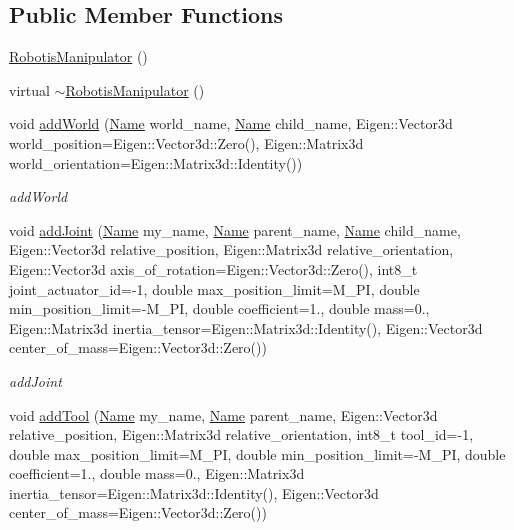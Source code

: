\subsection*{Public Member Functions}
\begin{DoxyCompactItemize}
\item 
\hyperlink{classrobotis__manipulator_1_1_robotis_manipulator_a46568e9e7167e38bc9f249ead260d07e}{Robotis\+Manipulator} ()
\item 
virtual \hyperlink{classrobotis__manipulator_1_1_robotis_manipulator_aa1a5253e03e807911de38637e7d409a6}{$\sim$\+Robotis\+Manipulator} ()
\item 
void \hyperlink{classrobotis__manipulator_1_1_robotis_manipulator_a31039ed1e93d8c9f1a83d31fadff4a5c}{add\+World} (\hyperlink{namespacerobotis__manipulator_a08c2d25e77a01ad75b9bb740f8ce4765}{Name} world\+\_\+name, \hyperlink{namespacerobotis__manipulator_a08c2d25e77a01ad75b9bb740f8ce4765}{Name} child\+\_\+name, Eigen\+::\+Vector3d world\+\_\+position=Eigen\+::\+Vector3d\+::\+Zero(), Eigen\+::\+Matrix3d world\+\_\+orientation=Eigen\+::\+Matrix3d\+::\+Identity())
\begin{DoxyCompactList}\small\item\em add\+World \end{DoxyCompactList}\item 
void \hyperlink{classrobotis__manipulator_1_1_robotis_manipulator_a7db29a00b1c10885f72bcf19798752fe}{add\+Joint} (\hyperlink{namespacerobotis__manipulator_a08c2d25e77a01ad75b9bb740f8ce4765}{Name} my\+\_\+name, \hyperlink{namespacerobotis__manipulator_a08c2d25e77a01ad75b9bb740f8ce4765}{Name} parent\+\_\+name, \hyperlink{namespacerobotis__manipulator_a08c2d25e77a01ad75b9bb740f8ce4765}{Name} child\+\_\+name, Eigen\+::\+Vector3d relative\+\_\+position, Eigen\+::\+Matrix3d relative\+\_\+orientation, Eigen\+::\+Vector3d axis\+\_\+of\+\_\+rotation=Eigen\+::\+Vector3d\+::\+Zero(), int8\+\_\+t joint\+\_\+actuator\+\_\+id=-\/1, double max\+\_\+position\+\_\+limit=M\+\_\+\+PI, double min\+\_\+position\+\_\+limit=-\/M\+\_\+\+PI, double coefficient=1., double mass=0., Eigen\+::\+Matrix3d inertia\+\_\+tensor=Eigen\+::\+Matrix3d\+::\+Identity(), Eigen\+::\+Vector3d center\+\_\+of\+\_\+mass=Eigen\+::\+Vector3d\+::\+Zero())
\begin{DoxyCompactList}\small\item\em add\+Joint \end{DoxyCompactList}\item 
void \hyperlink{classrobotis__manipulator_1_1_robotis_manipulator_ae6901cd9a845b0439b73f8bd6a27dec2}{add\+Tool} (\hyperlink{namespacerobotis__manipulator_a08c2d25e77a01ad75b9bb740f8ce4765}{Name} my\+\_\+name, \hyperlink{namespacerobotis__manipulator_a08c2d25e77a01ad75b9bb740f8ce4765}{Name} parent\+\_\+name, Eigen\+::\+Vector3d relative\+\_\+position, Eigen\+::\+Matrix3d relative\+\_\+orientation, int8\+\_\+t tool\+\_\+id=-\/1, double max\+\_\+position\+\_\+limit=M\+\_\+\+PI, double min\+\_\+position\+\_\+limit=-\/M\+\_\+\+PI, double coefficient=1., double mass=0., Eigen\+::\+Matrix3d inertia\+\_\+tensor=Eigen\+::\+Matrix3d\+::\+Identity(), Eigen\+::\+Vector3d center\+\_\+of\+\_\+mass=Eigen\+::\+Vector3d\+::\+Zero())

\end{DoxyCompactItemize}
